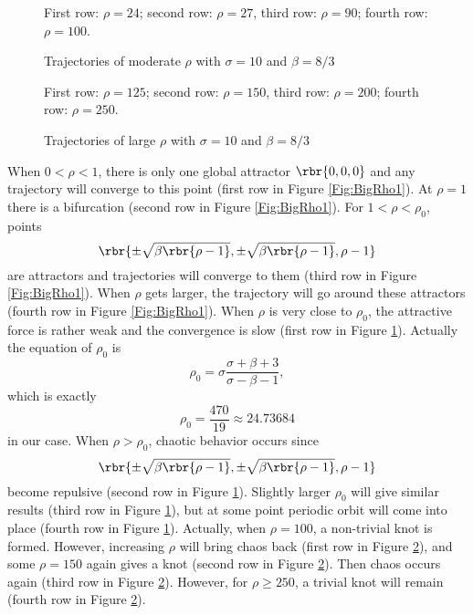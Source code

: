 \documentclass[english, nochinese]{pnote}
\begin{document}
\begin{figure}[htbp]
{
\centering
\scalebox{0.5}{}
\scalebox{0.5}{}
\scalebox{0.5}{}
\scalebox{0.5}{}
\caption{Trajectories of moderate $\rho$ with $ \sigma = 10 $ and $ \beta = 8 / 3 $}
\label{Fig:BigRho2}
}
{
\footnotesize First row: $ \rho = 24 $; second row: $ \rho = 27 $, third row: $ \rho = 90 $; fourth row: $ \rho = 100 $.
}
\end{figure}

\begin{figure}[htbp]
{
\centering
\scalebox{0.5}{}
\scalebox{0.5}{}
\scalebox{0.5}{}
\scalebox{0.5}{}
\caption{Trajectories of large $\rho$ with $ \sigma = 10 $ and $ \beta = 8 / 3 $}
\label{Fig:BigRho3}
}
{
\footnotesize First row: $ \rho = 125 $; second row: $ \rho = 150 $, third row: $ \rho = 200 $; fourth row: $ \rho = 250 $.
}
\end{figure}

When $ 0 < \rho < 1 $, there is only one global attractor $ \rbr{ 0, 0, 0 } $ and any trajectory will converge to this point (first row in Figure \ref{Fig:BigRho1}). At $ \rho = 1 $ there is a bifurcation (second row in Figure \ref{Fig:BigRho1}). For $ 1 < \rho < \rho_0 $, points
\begin{equation}
\rbr{ \pm \sqrt{ \beta \rbr{ \rho - 1 } }, \pm \sqrt{ \beta \rbr{ \rho - 1 } }, \rho - 1 }
\end{equation}
are attractors and trajectories will converge to them (third row in Figure \ref{Fig:BigRho1}). When $\rho$ gets larger, the trajectory will go around these attractors (fourth row in Figure \ref{Fig:BigRho1}). When $\rho$ is very close to $\rho_0$, the attractive force is rather weak and the convergence is slow (first row in Figure \ref{Fig:BigRho2}). Actually the equation of $\rho_0$ is
\begin{equation} \label{Eq:Sigma}
\rho_0 = \sigma \frac{ \sigma + \beta + 3 }{ \sigma - \beta - 1 },
\end{equation}
which is exactly
\begin{equation}
\rho_0 = \frac{470}{19} \approx 24.73684
\end{equation}
in our case. When $ \rho > \rho_0 $, chaotic behavior occurs since
\begin{equation}
\rbr{ \pm \sqrt{ \beta \rbr{ \rho - 1 } }, \pm \sqrt{ \beta \rbr{ \rho - 1 } }, \rho - 1 }
\end{equation}
become repulsive (second row in Figure \ref{Fig:BigRho2}). Slightly larger $\rho_0$ will give similar results (third row in Figure \ref{Fig:BigRho2}), but at some point periodic orbit will come into place (fourth row in Figure \ref{Fig:BigRho2}). Actually, when $ \rho = 100 $, a non-trivial knot is formed. However, increasing $\rho$ will bring chaos back (first row in Figure \ref{Fig:BigRho3}), and some $ \rho = 150 $ again gives a knot (second row in Figure \ref{Fig:BigRho3}). Then chaos occurs again (third row in Figure \ref{Fig:BigRho3}). However, for $ \rho \ge 250 $, a trivial knot will remain (fourth row in Figure \ref{Fig:BigRho3}).
\end{document}

